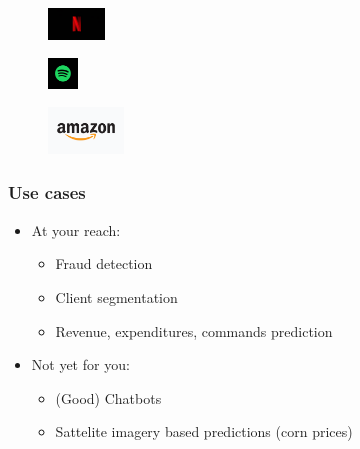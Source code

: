 \begin{frame}
   \begin{minipage}{0.2\linewidth}
      \begin{figure}[H]
         \includegraphics[width=1.5cm]{../images/illustrations/netflix.jpeg}
      \end{figure}
   \end{minipage}
   \begin{minipage}{0.1\linewidth}
      \begin{figure}[H]
         \includegraphics[width=0.8cm]{../images/illustrations/spotify.jpeg}
      \end{figure}
   \end{minipage}
   \begin{minipage}{0.1\linewidth}
      \begin{figure}[H]
         \includegraphics[width=2cm]{../images/illustrations/amazon.png}
      \end{figure}
   \end{minipage}

\end{frame}


\begin{frame}\frametitle{Use cases}
   \begin{itemize}
      \item At your reach:
      \begin{itemize}
         \item Fraud detection
         \item Client segmentation
         \item Revenue, expenditures, commands prediction
      \end{itemize}
      \item Not yet for you:
      \begin{itemize}
         \item (Good) Chatbots
         \item Sattelite imagery based predictions (corn prices)
      \end{itemize}
   \end{itemize}
\end{frame}



